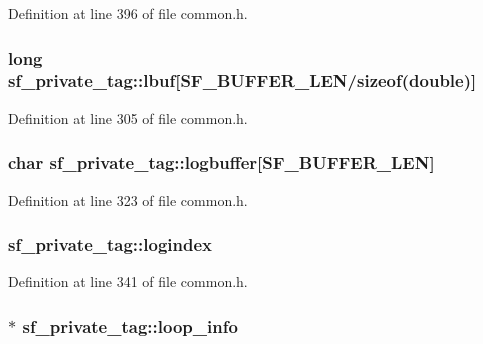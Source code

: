 Definition at line 396 of file common.\+h.

\subsubsection[{\texorpdfstring{lbuf}{lbuf}}]{\setlength{\rightskip}{0pt plus 5cm}long sf\+\_\+private\+\_\+tag\+::lbuf\mbox{[}{\bf S\+F\+\_\+\+B\+U\+F\+F\+E\+R\+\_\+\+L\+EN}/sizeof(double)\mbox{]}}\hypertarget{structsf__private__tag_a9f64bd792bf5663e28933743bad997ce}{}\label{structsf__private__tag_a9f64bd792bf5663e28933743bad997ce}


Definition at line 305 of file common.\+h.

\subsubsection[{\texorpdfstring{logbuffer}{logbuffer}}]{\setlength{\rightskip}{0pt plus 5cm}char sf\+\_\+private\+\_\+tag\+::logbuffer\mbox{[}{\bf S\+F\+\_\+\+B\+U\+F\+F\+E\+R\+\_\+\+L\+EN}\mbox{]}}\hypertarget{structsf__private__tag_a737949e51b02b0cf9fecd65b57071cf6}{}\label{structsf__private__tag_a737949e51b02b0cf9fecd65b57071cf6}


Definition at line 323 of file common.\+h.

\subsubsection[{\texorpdfstring{logindex}{logindex}}]{ sf\+\_\+private\+\_\+tag\+::logindex}\hypertarget{structsf__private__tag_aef39a84eab705961573a8fcf2b3e4f18}{}\label{structsf__private__tag_aef39a84eab705961573a8fcf2b3e4f18}


Definition at line 341 of file common.\+h.

\subsubsection[{\texorpdfstring{loop\+\_\+info}{loop_info}}]{$\ast$ sf\+\_\+private\+\_\+tag\+::loop\+\_\+info}\hypertarget{structsf__private__tag_aa2593a83235ea0cb96478f2198d51e22}{}\label{structsf__private__tag_aa2593a83235ea0cb96478f2198d51e22}


